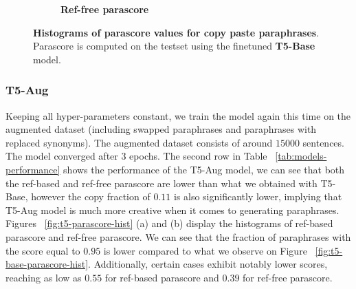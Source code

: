 \documentclass[fleqn,moreauthors,10pt]{ds_report}
\begin{document}
\begin{figure}[ht]
\begin{subfigure}{0.45\linewidth}
        \caption{\textbf{Ref-free parascore}}
        \label{fig:t5-aug-parascore-ref-free-hist}
    \end{subfigure}
    \caption{\textbf{Histograms of parascore values for copy paste paraphrases}. Parascore is computed on the testset using the finetuned \textbf{T5-Base} model.}
    \label{fig:t5-copy-paste-hist}
\end{figure}


\subsubsection{T5-Aug}

Keeping all hyper-parameters constant, we train the model again this time on the augmented dataset (including swapped paraphrases and paraphrases with replaced synonyms). The augmented dataset consists of around $15000$ sentences. The model converged after $3$ epochs. The second row in Table ~\ref{tab:models-performance} shows the performance of the T5-Aug model, we can see that both the ref-based and ref-free parascore are lower than what we obtained with T5-Base, however the copy fraction of $0.11$ is also significantly lower, implying that T5-Aug model is much more creative when it comes to generating paraphrases. Figures ~\ref{fig:t5-parascore-hist} (a) and (b) display the histograms of ref-based parascore and ref-free parascore. We can see that the fraction of paraphrases with the score equal to $0.95$ is lower compared to what we observe on Figure ~\ref{fig:t5-base-parascore-hist}. Additionally, certain cases exhibit notably lower scores, reaching as low as $0.55$ for ref-based parascore and $0.39$ for ref-free parascore.
\end{document}
